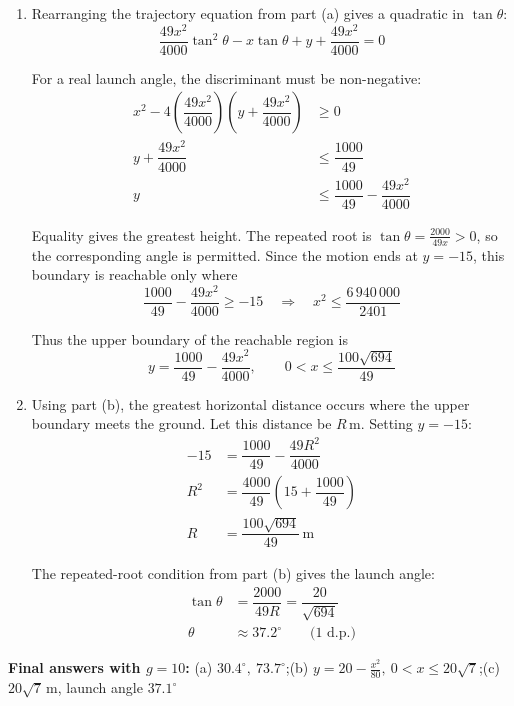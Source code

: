 \documentclass[leqno]{article}
\begin{document}
\begin{enumerate}[
  label=\textbf{\arabic*.},
  leftmargin=*,
  topsep=0pt,
  partopsep=0pt,
  parsep=0pt
]
\begin{djsSolution}
\begin{enumerate}[label=\textbf{(\alph*)}, start=1]
Both roots are positive and give angles in the permitted interval:
\[
\theta=30.0^\circ\quad\text{or}\quad74.1^\circ
\qquad\text{(1 d.p.)}
\]

\item Rearranging the trajectory equation from part (a) gives a quadratic in \(\tan\theta\):
\[
\dfrac{49x^2}{4000}\tan^2\theta-x\tan\theta+y+\dfrac{49x^2}{4000}=0
\]

For a real launch angle, the discriminant must be non-negative:
\begin{align*}
x^2-4\left(\dfrac{49x^2}{4000}\right)\left(y+\dfrac{49x^2}{4000}\right)&\geq0\\
y+\dfrac{49x^2}{4000}&\leq\dfrac{1000}{49}\\
y&\leq\dfrac{1000}{49}-\dfrac{49x^2}{4000}
\end{align*}

Equality gives the greatest height. The repeated root is \(\tan\theta=\frac{2000}{49x}>0\), so the corresponding angle is permitted. Since the motion ends at \(y=-15\), this boundary is reachable only where
\[
\dfrac{1000}{49}-\dfrac{49x^2}{4000}\geq-15
\quad\Longrightarrow\quad
x^2\leq\dfrac{6\,940\,000}{2401}
\]

Thus the upper boundary of the reachable region is
\[
y=\dfrac{1000}{49}-\dfrac{49x^2}{4000},
\qquad 0<x\leq\dfrac{100\sqrt{694}}{49}
\]

\item Using part (b), the greatest horizontal distance occurs where the upper boundary meets the ground. Let this distance be \(R\,\mathrm{m}\). Setting \(y=-15\):
\begin{align*}
-15&=\dfrac{1000}{49}-\dfrac{49R^2}{4000}\\
R^2&=\dfrac{4000}{49}\left(15+\dfrac{1000}{49}\right)\\
R&=\dfrac{100\sqrt{694}}{49}\,\mathrm{m}
\end{align*}

The repeated-root condition from part (b) gives the launch angle:
\begin{align*}
\tan\theta&=\dfrac{2000}{49R}=\dfrac{20}{\sqrt{694}}\\
\theta&\approx37.2^\circ\qquad\text{(1 d.p.)}
\end{align*}

\end{enumerate}
\par\medskip\noindent\textbf{Final answers with \(g = 10\):} (a) \(30.4^\circ,\ 73.7^\circ\);\quad (b) \(y=20-\frac{x^2}{80},\ 0<x\leq20\sqrt7\);\quad (c) \(20\sqrt7\,\mathrm{m}\), launch angle \(37.1^\circ\)
\end{djsSolution}


\end{enumerate}
\end{document}
